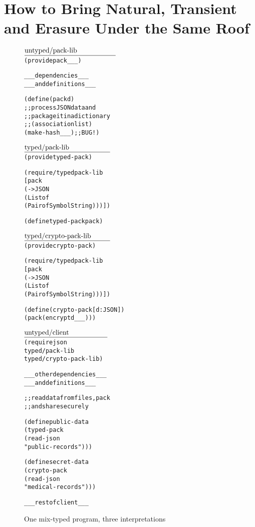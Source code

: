 \section{How to Bring Natural, Transient and Erasure Under the Same Roof} 
\label{sec:landscape}


\def\fname#1#2{$\underline{\hbox to #2in{#1}}$\\[-2ex]}

\begin{figure*}[hbt]\footnotesize
  \vspace{-1mm}

\begin{minipage}[t]{2.2in}
\begin{alltt}\fname{untyped/pack-lib}{1.8}
(provide pack _ _ _)

_ _ _  dependencies     _ _ _
_ _ _  and definitions  _ _ _

(define (pack d)
  ;; process JSON data and 
  ;; package it in a dictionary
  ;; (association list)
  (make-hash _ _ _) ;; BUG!)


\end{alltt}
\end{minipage}\begin{minipage}[t]{2.2in}
\begin{alltt}\fname{typed/pack-lib}{1.7}
(provide typed-pack)

(require/typed pack-lib
  [pack 
  (-> JSON 
      (Listof 
       (Pairof Symbol String)))])

(define typed-pack pack) 
\end{alltt}
\smallskip
\begin{alltt}\fname{typed/crypto-pack-lib}{1.7}
(provide crypto-pack) 

(require/typed pack-lib
 [pack 
  (-> JSON 
      (Listof 
       (Pairof Symbol String)))])

(define (crypto-pack [d : JSON])
  (pack (encrypt d _ _ _)))

 \end{alltt}
\end{minipage}\begin{minipage}[t]{2.2in}
\begin{alltt}\fname{untyped/client}{1.65}
(require json 
         typed/pack-lib
           typed/crypto-pack-lib)

_ _ _  other dependencies  _ _ _
_ _ _  and definitions     _ _ _
          
;; read data from files, pack 
;; and share securely 

(define public-data 
  (typed-pack 
   (read-json 
    "public-records")))

(define secret-data 
  (crypto-pack 
   (read-json 
    "medical-records")))
 
 _ _ _ rest of client _ _ _
\end{alltt}\end{minipage}

   \caption{One mix-typed program, three interpretations} \label{fig:example}

  \vspace{-1mm}
\end{figure*}

